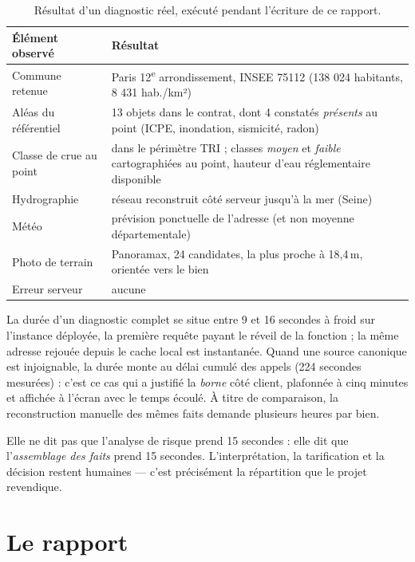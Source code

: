 \begin{table}[h]
\centering
\small
\begin{tabularx}{\textwidth}{@{}p{5.2cm}X@{}}
\toprule
\textbf{Élément observé} & \textbf{Résultat} \\
\midrule
Commune retenue & Paris 12\textsuperscript{e} arrondissement, INSEE 75112 (138 024 habitants, 8 431 hab./km²) \\
Aléas du référentiel & 13 objets dans le contrat, dont 4 constatés \emph{présents} au point (ICPE, inondation, sismicité, radon) \\
Classe de crue au point & dans le périmètre TRI ; classes \emph{moyen} et \emph{faible} cartographiées au point, hauteur d'eau réglementaire disponible \\
Hydrographie & réseau reconstruit côté serveur jusqu'à la mer (Seine) \\
Météo & prévision ponctuelle de l'adresse (et non moyenne départementale) \\
Photo de terrain & Panoramax, 24 candidates, la plus proche à 18,4\,m, orientée vers le bien \\
Erreur serveur & aucune \\
\bottomrule
\end{tabularx}
\caption{Résultat d'un diagnostic réel, exécuté pendant l'écriture de ce rapport.}
\end{table}

La durée d'un diagnostic complet se situe entre 9 et 16 secondes à froid sur
l'instance déployée, la première requête payant le réveil de la fonction ; la
même adresse rejouée depuis le cache local est instantanée. Quand une source
canonique est injoignable, la durée monte au délai cumulé des appels
(224 secondes mesurées) : c'est ce cas qui a justifié la \emph{borne} côté
client, plafonnée à cinq minutes et affichée à l'écran avec le temps écoulé.
À titre de comparaison, la reconstruction manuelle des mêmes faits demande
plusieurs heures par bien.

\begin{encadre}[title={Ce que cette mesure ne dit pas}]
Elle ne dit pas que l'analyse de risque prend 15 secondes : elle dit que
l'\emph{assemblage des faits} prend 15 secondes. L'interprétation, la
tarification et la décision restent humaines — c'est précisément la répartition
que le projet revendique.
\end{encadre}

\section{Le rapport}

